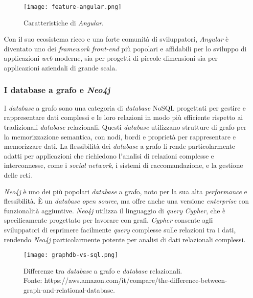 \begin{figure}[h] 
  \centering 
  \texttt{[image: feature-angular.png]} 
  \caption{Caratteristiche di \textit{Angular}.}
  \label{fig:feature-angular}
\end{figure}

Con il suo ecosistema ricco e una forte comunità di sviluppatori, \textit{Angular} è diventato uno dei \textit{framework} \textit{front-end} più popolari e 
affidabili per lo sviluppo di applicazioni \textit{web} moderne, sia per progetti di piccole dimensioni sia per applicazioni aziendali di grande scala.

\subsubsection*{I database a grafo e \textit{Neo4j}}

I \textit{database} a grafo sono una categoria di \textit{database} NoSQL progettati per gestire e rappresentare dati complessi e le loro relazioni 
in modo più efficiente rispetto ai tradizionali \textit{database} relazionali. Questi \textit{database} utilizzano strutture di grafo per la memorizzazione 
semantica, con nodi, bordi e proprietà per rappresentare e memorizzare dati. La flessibilità dei \textit{database} a grafo li rende particolarmente 
adatti per applicazioni che richiedono l'analisi di relazioni complesse e interconnesse, come i \textit{social network}, i sistemi di raccomandazione, 
e la gestione delle reti.

\textit{Neo4j} è uno dei più popolari \textit{database} a grafo, noto per la sua alta \textit{performance} e flessibilità. È un \textit{database} \textit{open source}, 
ma offre anche una versione \textit{enterprise} con funzionalità aggiuntive. \textit{Neo4j} utilizza il linguaggio di \textit{query} \textit{Cypher}, che è specificamente 
progettato per lavorare con grafi. \textit{Cypher} consente agli sviluppatori di esprimere facilmente \textit{query} complesse sulle relazioni tra i dati, 
rendendo \textit{Neo4j} particolarmente potente per analisi di dati relazionali complessi.

\begin{figure}[h] 
  \centering 
  \texttt{[image: graphdb-vs-sql.png]} 
  \caption{Differenze tra \textit{database} a grafo e \textit{database} relazionali. \\Fonte: https://aws.amazon.com/it/compare/the-difference-between-graph-and-relational-database.}
  \label{fig:graphdb-vs-sql}
\end{figure}

